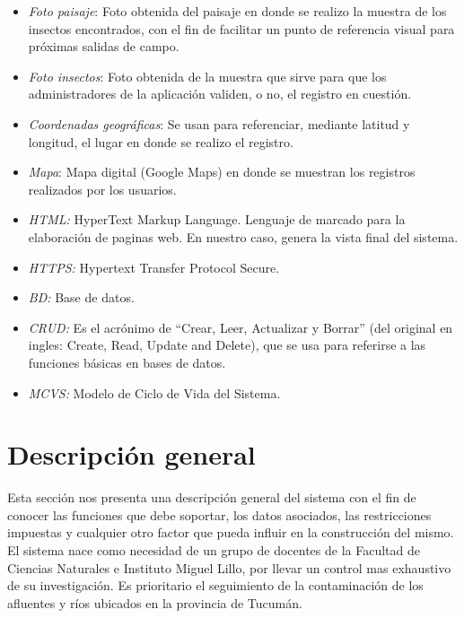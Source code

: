 \begin{itemize}
        \item \emph{Foto paisaje}: Foto obtenida del paisaje en donde se realizo la muestra de los insectos encontrados, con el fin de facilitar un punto de referencia visual para próximas salidas de campo.
        
        \item \emph{Foto insectos}: Foto obtenida de la muestra que sirve para que los administradores de la aplicación validen, o no, el registro en cuestión.
        
        \item \emph{Coordenadas geográficas}: Se usan para referenciar, mediante latitud y longitud, el lugar en donde se realizo el registro.
        
        \item \emph{Mapa}: Mapa digital (Google Maps) en donde se muestran los registros realizados por los usuarios.
        
        \item \emph{HTML:} HyperText Markup Language. Lenguaje de marcado para la elaboración de paginas web. En nuestro caso, genera la vista final del sistema.
        
        \item \emph{HTTPS:} Hypertext Transfer Protocol Secure.
        
        \item \emph{BD:} Base de datos.
        
        \item \emph{CRUD:} Es el acrónimo de ``Crear, Leer, Actualizar y Borrar'' (del original en ingles: Create, Read, Update and Delete), que se usa para referirse a las funciones básicas en bases de datos.
        
        \item \emph{MCVS:} Modelo de Ciclo de Vida del Sistema.
      \end{itemize}

  \section{Descripción general}

    Esta sección nos presenta una descripción general del sistema con el fin de conocer las funciones que debe soportar, los datos asociados, las restricciones impuestas y cualquier otro factor que pueda influir en la construcción del mismo.
    El sistema nace como necesidad de un grupo de docentes de la Facultad de Ciencias Naturales e Instituto Miguel Lillo, por llevar un control mas exhaustivo de su investigación.
    Es prioritario el seguimiento de la contaminación de los afluentes y ríos ubicados en la provincia de Tucumán.

